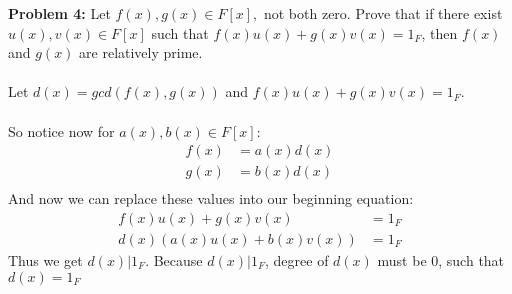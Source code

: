 \documentclass[12pt]{article}
\begin{document}
\noindent \textbf{Problem 4: }Let $f(x), g(x) \in F[x],$ not both zero. Prove that if there exist $u(x), v(x) \in
F[x]$ such that $f(x)u(x) + g(x)v(x) = 1_F$, then $f(x)$ and $g(x)$ are relatively prime.
\\ \\
Let $d(x) = gcd(f(x),g(x))$ and $f(x)u(x) + g(x)v(x) = 1_F$. 
\\ \\
So notice now for $a(x),b(x) \in F[x]$:
	\begin{align*}
		f(x) &= a(x)d(x) \\
		g(x) &= b(x)d(x) \\
	\end{align*}
And now we can replace these values into our beginning equation:
	\begin{align*}
		f(x)u(x) + g(x)v(x) &= 1_F \\
		d(x)(a(x)u(x) + b(x)v(x)) &= 1_F
	\end{align*}
Thus we get $d(x)|1_F$. Because $d(x)|1_F$, degree of $d(x)$ must be 0, such that $d(x) = 1_F$
\end{document}
